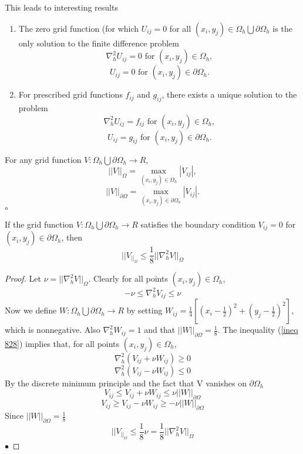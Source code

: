 This leads to interesting results
\begin{proposition}
\begin{enumerate}
\item
The zero grid function (for which $U_{ij}=0$ for all $(x_i,y_j) \in \Omega_h \bigcup \partial\Omega_h$
is the only solution to the finite difference problem
\[\nabla_h^2U_{ij}=0 \mbox{ for }(x_i,y_j)\in\Omega_h,\]
\[U_{ij}=0 \mbox{ for }(x_i,y_j)\in\partial\Omega_h.\]
\item
For prescribed grid functions $f_{ij}$ and $g_{ij}$, there exists a unique solution to the problem
\[\nabla_h^2U_{ij}=f_{ij} \mbox{ for }(x_i,y_j)\in\Omega_h,\]
\[U_{ij}=g_{ij} \mbox{ for }(x_i,y_j)\in\partial\Omega_h.\]
\end{enumerate}
\end{proposition}
\begin{definition}
For any grid function $V:\Omega_h\bigcup\partial\Omega_h \rightarrow R$,
\[||V||_{\Omega} =\max_{(x_i,y_j)\in\Omega_h}|V_{ij}|, \]
\[||V||_{\partial\Omega} =\max_{(x_i,y_j)\in\partial\Omega_h}|V_{ij}|. \]
$\circ$
\end{definition}
\begin{lemma}
If the grid function $V:\Omega_h\bigcup\partial\Omega_h\rightarrow R$ satisfies the boundary condition $V_{ij}=0$ for $(x_i,y_j)\in \partial\Omega_h$, then
\[||V_||_{\Omega}\leq \frac{1}{8}||\nabla_h^2V||_{\Omega} \]
\end{lemma}
\begin{proof}
Let $\nu = ||\nabla_{h}^2V||_{\Omega}$. Clearly for all points $(x_i,y_j)\in\Omega_h$,
\begin{equation}\label{ineq 828}
-\nu \leq \nabla_{h}^2V_{ij} \leq \nu \end{equation}
Now we define $W:\Omega_h \bigcup \partial\Omega_h \rightarrow R$ by setting 
$W_{ij}=\frac{1}{4}[(x_i-\frac{1}{2})^2+(y_j-\frac{1}{2})^2]$, which is nonnegative.  Also $\nabla_h^2W_{ij}=1$ and that $||W||_{\partial\Omega}=\frac{1}{8}$.
The inequality (\ref{ineq 828}) implies that, for all points $(x_i,y_j)\in\Omega_h$,
\[\nabla_h^2(V_{ij}+\nu W_{ij})\geq 0 \]
\[\nabla_h^2(V_{ij}-\nu W_{ij})\leq 0 \]
By the discrete minimum principle and the fact that V vanishes on $\partial\Omega_h$
\[V_{ij}\leq V_{ij}+\nu W_{ij}\leq \nu||W||_{\partial\Omega} \]
\[V_{ij}\geq V_{ij}-\nu W_{ij}\geq -\nu||W||_{\partial\Omega} \]
Since $||W||_{\partial\Omega}=\frac{1}{8}$
\[||V_||_{\Omega}\leq \frac{1}{8}\nu =\frac{1}{8}||\nabla_h^2V||_{\Omega} \]
$\bullet$\end{proof}
